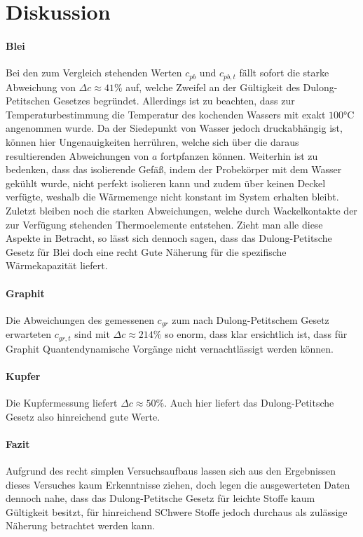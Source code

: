 \section{Diskussion}
\label{sec:Diskussion}


\paragraph{Blei}

Bei den zum Vergleich stehenden Werten $c_{pb}$ und $c_{pb,t}$ fällt sofort die starke Abweichung von $\Delta c \approx 41 \%$ auf, welche Zweifel an der Gültigkeit des Dulong-Petitschen Gesetzes begründet. Allerdings ist zu beachten, dass zur Temperaturbestimmung die Temperatur des kochenden Wassers mit exakt $100 \si{\celsius}$ angenommen wurde. Da der Siedepunkt von Wasser jedoch druckabhängig ist, können hier Ungenauigkeiten herrühren, welche sich über die daraus resultierenden Abweichungen von $a$ fortpfanzen können. Weiterhin ist zu bedenken, dass das isolierende Gefäß, indem der Probekörper mit dem Wasser gekühlt wurde, nicht perfekt isolieren kann und zudem über keinen Deckel verfügte, weshalb die Wärmemenge nicht konstant im System erhalten bleibt. Zuletzt bleiben noch die starken Abweichungen, welche durch Wackelkontakte der zur Verfügung stehenden Thermoelemente entstehen.
Zieht man alle diese Aspekte in Betracht, so lässt sich dennoch sagen, dass das Dulong-Petitsche Gesetz für Blei doch eine recht Gute Näherung für die spezifische Wärmekapazität liefert.

\paragraph{Graphit}
Die Abweichungen des gemessenen $c_{gr}$ zum nach Dulong-Petitschem Gesetz erwarteten $c_{gr,t}$ sind mit $\Delta c \approx 214 \%$ so enorm, dass klar ersichtlich ist, dass für Graphit Quantendynamische Vorgänge nicht vernachtlässigt werden können.

\paragraph{Kupfer}
Die Kupfermessung liefert $\Delta c \approx 50 \%$. Auch hier liefert das Dulong-Petitsche Gesetz also hinreichend gute Werte.

\paragraph{Fazit}
Aufgrund des recht simplen Versuchsaufbaus lassen sich aus den Ergebnissen dieses Versuches kaum Erkenntnisse ziehen, doch legen die ausgewerteten Daten dennoch nahe, dass das Dulong-Petitsche Gesetz für leichte Stoffe kaum Gültigkeit besitzt, für hinreichend SChwere Stoffe jedoch durchaus als zulässige Näherung betrachtet werden kann.
